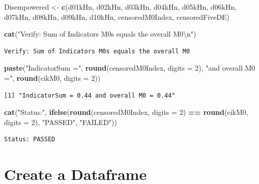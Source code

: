 \documentclass[
]{book}
\newenvironment{Shaded}{\begin{snugshade}}{\end{snugshade}}
\newcommand{\CharTok}[1]{\textcolor[rgb]{0.31,0.60,0.02}{#1}}
\newcommand{\DataTypeTok}[1]{\textcolor[rgb]{0.13,0.29,0.53}{#1}}
\newcommand{\DecValTok}[1]{\textcolor[rgb]{0.00,0.00,0.81}{#1}}
\newcommand{\KeywordTok}[1]{\textcolor[rgb]{0.13,0.29,0.53}{\textbf{#1}}}
\newcommand{\NormalTok}[1]{#1}
\newcommand{\OperatorTok}[1]{\textcolor[rgb]{0.81,0.36,0.00}{\textbf{#1}}}
\newcommand{\StringTok}[1]{\textcolor[rgb]{0.31,0.60,0.02}{#1}}
\begin{document}
\begin{Shaded}
\begin{Highlighting}[]
\NormalTok{Disempowered \textless{}{-}}\StringTok{ }\KeywordTok{c}\NormalTok{(d01kHn, d02kHn, d03kHn, d04kHn, d05kHn, d06kHn, d07kHn, d08kHn, d09kHn, d10kHn, censoredM0Index, censoredFiveDE)}

\KeywordTok{cat}\NormalTok{(}\StringTok{"Verify: Sum of Indicators M0s equals the overall M0}\CharTok{\textbackslash{}n}\StringTok{"}\NormalTok{)}
\end{Highlighting}
\end{Shaded}

\begin{verbatim}
Verify: Sum of Indicators M0s equals the overall M0
\end{verbatim}

\begin{Shaded}
\begin{Highlighting}[]
\KeywordTok{paste}\NormalTok{(}\StringTok{"IndicatorSum ="}\NormalTok{, }\KeywordTok{round}\NormalTok{(censoredM0Index, }\DataTypeTok{digits =} \DecValTok{2}\NormalTok{), }\StringTok{"and overall M0 ="}\NormalTok{, }\KeywordTok{round}\NormalTok{(cikM0, }\DataTypeTok{digits =} \DecValTok{2}\NormalTok{))}
\end{Highlighting}
\end{Shaded}

\begin{verbatim}
[1] "IndicatorSum = 0.44 and overall M0 = 0.44"
\end{verbatim}

\begin{Shaded}
\begin{Highlighting}[]
\KeywordTok{cat}\NormalTok{(}\StringTok{"Status:"}\NormalTok{, }\KeywordTok{ifelse}\NormalTok{(}\KeywordTok{round}\NormalTok{(censoredM0Index, }\DataTypeTok{digits =} \DecValTok{2}\NormalTok{) }\OperatorTok{==}\StringTok{ }\KeywordTok{round}\NormalTok{(cikM0, }\DataTypeTok{digits =} \DecValTok{2}\NormalTok{), }\StringTok{"PASSED"}\NormalTok{, }\StringTok{"FAILED"}\NormalTok{))}
\end{Highlighting}
\end{Shaded}

\begin{verbatim}
Status: PASSED
\end{verbatim}

\hypertarget{create-a-dataframe}{%
\section{Create a Dataframe}\label{create-a-dataframe}}
\end{document}
